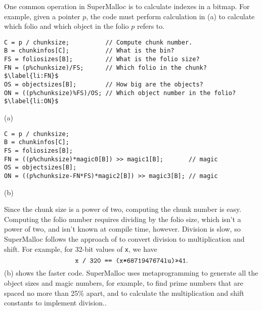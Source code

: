 \documentclass[natbib,sort&compress,10pt]{sigplanconf}
\newcommand{\code}[1]{\texttt{#1}}
\begin{document}

One common operation in SuperMalloc is to calculate indexes in a
bitmap.  For example, given a pointer $p$, the code must perform
calculation in (a) to calculate which folio and which
object in the folio $p$ refers to.

\begin{figure*}
\begin{verbatim}
C = p / chunksize;          // Compute chunk number.
B = chunkinfos[C];          // What is the bin?
FS = foliosizes[B];         // What is the folio size?
FN = (p%chunksize)/FS;      // Which folio in the chunk?$\label{li:FN}$
OS = objectsizes[B];        // How big are the objects?
ON = ((p%chunksize)%FS)/OS; // Which object number in the folio?$\label{li:ON}$
\end{verbatim}
\begin{center}
(a)
\end{center}
\begin{verbatim}
C = p / chunksize;
B = chunkinfos[C];
FS = foliosizes[B];
FN = ((p%chunksize)*magic0[B]) >> magic1[B];       // magic
OS = objectsizes[B];
ON = ((p%chunksize-FN*FS)*magic2[B]) >> magic3[B]; // magic
\end{verbatim}
\begin{center}
(b)
\end{center}
\caption{The calculation to compute the folio number in the chunk,
  \code{FN}, and the object number in the folio \code{ON}, so that the
  bitmap for the free objects in the folio can be updated.  (a) shows
  the code with expensive divisions in .  (b) shows
  the code with the divisions replaced by multiplication and shift.}
\label{fig:bitindex}
\end{figure*}


Since the chunk size is a power of two, computing the chunk number is
easy.  Computing the folio number requires dividing by the folio size,
which isn't a power of two, and isn't known at compile time, however.
Division is slow, so SuperMalloc follows the approach of
\cite{MagenheimerPePe87} to convert division to multiplication and
shift.  For example, for 32-bit values of \code{x}, we have
\[\mbox{\code{x / 320 == (x*6871947674lu)>>41}}.\]
(b) shows the faster code.  SuperMalloc uses
metaprogramming to generate all the object sizes and magic numbers,
for example, to find prime numbers that are spaced no more than 25\%
apart, and to calculate the multiplication and shift constants to
implement division..
\end{document}
